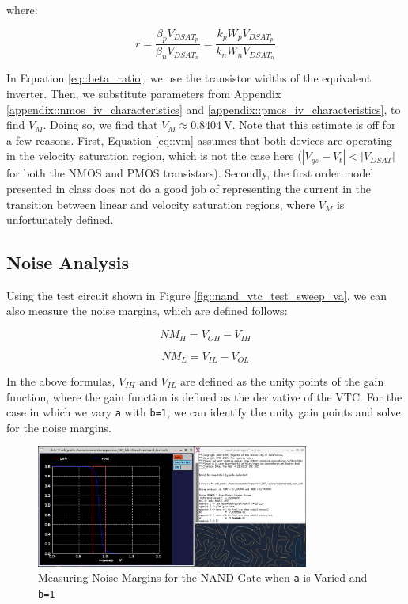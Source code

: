 \documentclass{article}
\begin{document}
	\noindent where:
	
	\begin{equation}
		\label{eq::beta_ratio}
		r = \frac{\beta_pV_{DSAT_p}}{\beta_nV_{DSAT_n}} = \frac{k_pW_pV_{DSAT_p}}{k_nW_nV_{DSAT_n}}
	\end{equation}
	
	\noindent In Equation \ref{eq::beta_ratio}, we use the transistor widths of the equivalent inverter. Then, we substitute parameters from Appendix \ref{appendix::nmos_iv_characteristics} and \ref{appendix::pmos_iv_characteristics}, to find $V_M$. Doing so, we find that $V_M \approx 0.8404\ \text{V}$. Note that this estimate is off for a few reasons. First, Equation \ref{eq::vm} assumes that both devices are operating in the velocity saturation region, which is not the case here ($|V_{gs} - V_t| < |V_{DSAT}|$ for both the NMOS and PMOS transistors). Secondly, the first order model presented in class does not do a good job of representing the current in the transition between linear and velocity saturation regions, where $V_M$ is unfortunately defined. 
	
	\subsection{Noise Analysis}
	\label{section::nand_noise_analysis}
	
	Using the test circuit shown in Figure \ref{fig::nand_vtc_test_sweep_va}, we can also measure the noise margins, which are defined follows:
	
	\begin{equation}
		NM_H = V_{OH} - V_{IH}
		\label{eq::noise_margin_high}
	\end{equation}
	
	\begin{equation}
		NM_L = V_{IL} - V_{OL}
		\label{eq::noise_margin_low}
	\end{equation}
	
	In the above formulas, $V_{IH}$ and $V_{IL}$ are defined as the unity points of the gain function, where the gain function is defined as the derivative of the VTC. For the case in which we vary \texttt{a} with \texttt{b=1}, we can identify the unity gain points and solve for the noise margins.
	
	\begin{figure}[H]
		\centerline{\includegraphics[width=0.8\textwidth]{nand_noise_analysis_sweep_va.png}}
		\caption{Measuring Noise Margins for the NAND Gate when \texttt{a} is Varied and \texttt{b=1}}	\label{fig::nand_noise_analysis_sweep_va}
	\end{figure}
	
\end{document}

